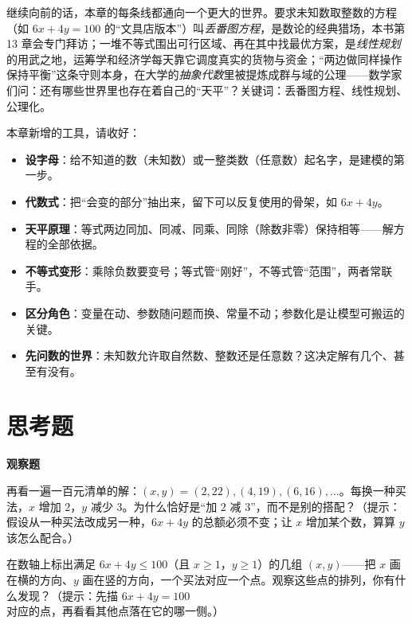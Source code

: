 \begin{pandeng}
继续向前的话，本章的每条线都通向一个更大的世界。要求未知数取整数的方程（如 $6x+4y=100$ 的“文具店版本”）叫\emph{丢番图方程}，是数论的经典猎场，本书第 13 章会专门拜访；一堆不等式围出可行区域、再在其中找最优方案，是\emph{线性规划}的用武之地，运筹学和经济学每天靠它调度真实的货物与资金；“两边做同样操作保持平衡”这条守则本身，在大学的\emph{抽象代数}里被提炼成群与域的公理——数学家们问：还有哪些世界里也存在着自己的“天平”？关键词：丢番图方程、线性规划、公理化。
\end{pandeng}

\begin{toolbox}
本章新增的工具，请收好：
\begin{itemize}
\item \textbf{设字母}：给不知道的数（未知数）或一整类数（任意数）起名字，是建模的第一步。
\item \textbf{代数式}：把“会变的部分”抽出来，留下可以反复使用的骨架，如 $6x+4y$。
\item \textbf{天平原理}：等式两边同加、同减、同乘、同除（除数非零）保持相等——解方程的全部依据。
\item \textbf{不等式变形}：乘除负数要变号；等式管“刚好”，不等式管“范围”，两者常联手。
\item \textbf{区分角色}：变量在动、参数随问题而换、常量不动；参数化是让模型可搬运的关键。
\item \textbf{先问数的世界}：未知数允许取自然数、整数还是任意数？这决定解有几个、甚至有没有。
\end{itemize}
\end{toolbox}

\section*{思考题}

\textbf{观察题}

\begin{sikao}
\item 再看一遍一百元清单的解：$(x,y)=(2,22),(4,19),(6,16),\dots$。每换一种买法，$x$ 增加 $2$，$y$ 减少 $3$。为什么恰好是“加 $2$ 减 $3$”，而不是别的搭配？（提示：假设从一种买法改成另一种，$6x+4y$ 的总额必须不变；让 $x$ 增加某个数，算算 $y$ 该怎么配合。）
\item 在数轴上标出满足 $6x+4y\leq100$（且 $x\geq1$，$y\geq1$）的几组 $(x,y)$——把 $x$ 画在横的方向、$y$ 画在竖的方向，一个买法对应一个点。观察这些点的排列，你有什么发现？（提示：先描 $6x+4y=100$ 对应的点，再看看其他点落在它的哪一侧。）
\end{sikao}

